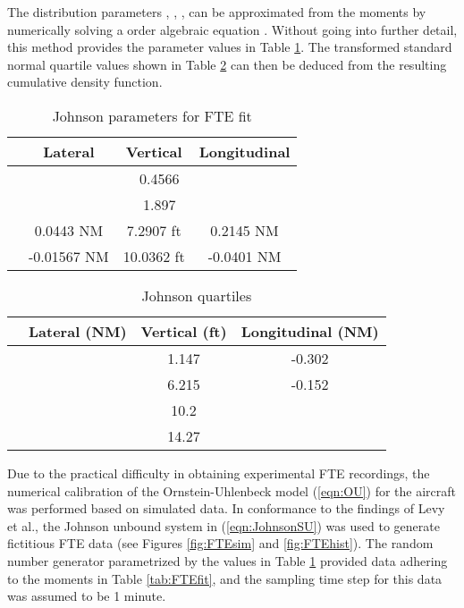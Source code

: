 \documentclass[conference]{IEEEtran}
\begin{document}
The distribution parameters , , ,  can be approximated from the moments by numerically solving a  order algebraic equation \cite{Win78}. Without going into further detail, this method provides the parameter values in Table \ref{tab:FTEparam}. The transformed standard normal quartile values shown in Table \ref{tab:quant} can then be deduced from the resulting cumulative density function.

\begin{table}
\caption{Johnson  parameters for FTE fit}
\label{tab:FTEparam}
\centering
\begin{tabular} {|c|c|c|c|}
\hline\hline
&Lateral&Vertical&Longitudinal \bigstrut\\ \hline\hline
 & \multicolumn{3}{c|}{0.4566} \bigstrut \\ \hline
& \multicolumn{3}{c|}{1.897} \bigstrut \\ \hline
&0.0443 NM& 7.2907 ft& 0.2145 NM \bigstrut \\ \hline
&-0.01567 NM& 10.0362 ft& -0.0401 NM \bigstrut \\ \hline\hline
\end{tabular}
\end{table}

\begin{table}
\caption{Johnson  quartiles}
\label{tab:quant}
\centering
\begin{tabular} {|c|c|c|c|}
\hline\hline
& Lateral (NM) & Vertical (ft) & Longitudinal (NM)\bigstrut\\ \hline\hline
 &  & 1.147 & -0.302 \bigstrut \\ \hline
 &  & 6.215 & -0.152 \bigstrut \\ \hline
 &  & 10.2 &  \bigstrut \\ \hline
 &  & 14.27 &  \bigstrut \\ \hline\hline
\end{tabular}
\end{table}

Due to the practical difficulty in obtaining experimental FTE recordings, the numerical calibration of the Ornstein-Uhlenbeck model (\ref{eqn:OU}) for the aircraft was performed based on simulated data. In conformance to the findings of Levy et al., the Johnson unbound system  in (\ref{eqn:JohnsonSU}) was used to generate fictitious FTE data (see Figures \ref{fig:FTEsim} and  \ref{fig:FTEhist}). The random number generator parametrized by the values in Table \ref{tab:FTEparam} provided data adhering to the moments in Table \ref{tab:FTEfit}, and the sampling time step for this data was assumed to be 1 minute.
\end{document}
